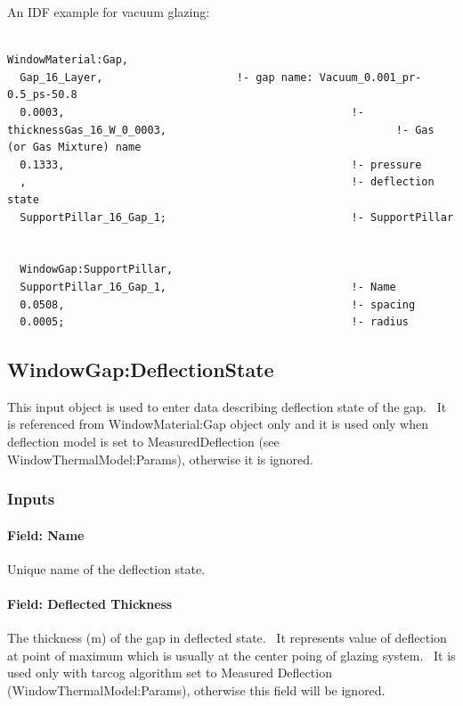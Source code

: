 An IDF example for vacuum glazing:

\begin{lstlisting}

WindowMaterial:Gap,
  Gap_16_Layer,                     !- gap name: Vacuum_0.001_pr-0.5_ps-50.8
  0.0003,                                             !- thicknessGas_16_W_0_0003,                                    !- Gas (or Gas Mixture) name
  0.1333,                                             !- pressure
  ,                                                   !- deflection state
  SupportPillar_16_Gap_1;                             !- SupportPillar


  WindowGap:SupportPillar,
  SupportPillar_16_Gap_1,                             !- Name
  0.0508,                                             !- spacing
  0.0005;                                             !- radius
\end{lstlisting}

\subsection{WindowGap:DeflectionState}\label{windowgapdeflectionstate}

This input object is used to enter data describing deflection state of the gap.~ It is referenced from WindowMaterial:Gap object only and it is used only when deflection model is set to MeasuredDeflection (see WindowThermalModel:Params), otherwise it is ignored.

\subsubsection{Inputs}\label{inputs-19-006}

\paragraph{Field: Name}\label{field-name-13-010}

Unique name of the deflection state.

\paragraph{Field: Deflected Thickness}\label{field-deflected-thickness}

The thickness (m) of the gap in deflected state.~ It represents value of deflection at point of maximum which is usually at the center poing of glazing system.~ It is used only with tarcog algorithm set to Measured Deflection (WindowThermalModel:Params), otherwise this field will be ignored.

